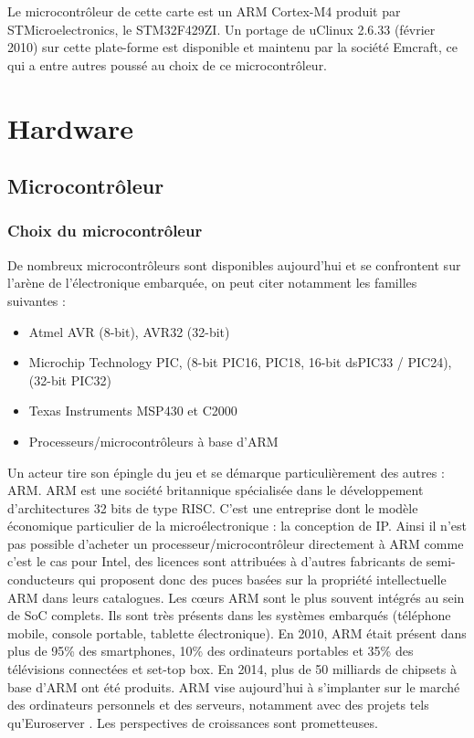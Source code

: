 Le microcontrôleur de cette carte est un ARM Cortex-M4 produit par STMicroelectronics, le STM32F429ZI.
Un portage de uClinux 2.6.33 (février 2010) sur cette plate-forme est disponible et maintenu par la société Emcraft, ce qui a entre autres poussé au choix de ce microcontrôleur.

\section{Hardware}
\subsection{Microcontrôleur}
\subsubsection{Choix du microcontrôleur}
De nombreux microcontrôleurs sont disponibles aujourd'hui et se confrontent sur l'arène de l'électronique embarquée, on peut citer notamment les familles suivantes :
\begin{itemize}
	\item Atmel AVR (8-bit), AVR32 (32-bit)
	\item Microchip Technology PIC, (8-bit PIC16, PIC18, 16-bit dsPIC33 / PIC24), (32-bit PIC32)
	\item Texas Instruments MSP430 et C2000
	\item Processeurs/microcontrôleurs à base d'ARM
\end{itemize}
            
Un acteur tire son épingle du jeu et se démarque particulièrement des autres : ARM.
ARM est une société britannique spécialisée dans le développement d'architectures 32 bits de type RISC. 
C'est une entreprise  dont le modèle économique particulier de la microélectronique : la conception de \gls{IP}.
Ainsi il n'est pas possible d'acheter un processeur/microcontrôleur directement à ARM comme c'est le cas pour Intel, des licences sont attribuées à d'autres fabricants de semi-conducteurs qui proposent donc des puces basées sur la propriété intellectuelle ARM dans leurs catalogues.
Les cœurs ARM sont le plus souvent intégrés au sein de \gls{SoC} complets.
Ils sont très présents dans les systèmes embarqués (téléphone mobile, console portable, tablette électronique).
En 2010, ARM était présent dans plus de 95\% des smartphones, 10\% des ordinateurs portables et 35\% des télévisions connectées et set-top box. \autocite{ARMMS}
En 2014, plus de 50 milliards de chipsets à base d'ARM ont été produits. ARM vise aujourd'hui à s'implanter sur le marché des ordinateurs personnels et des serveurs, notamment avec des projets tels qu'Euroserver \autocite{Euroserver}.
Les perspectives de croissances sont prometteuses.
            
